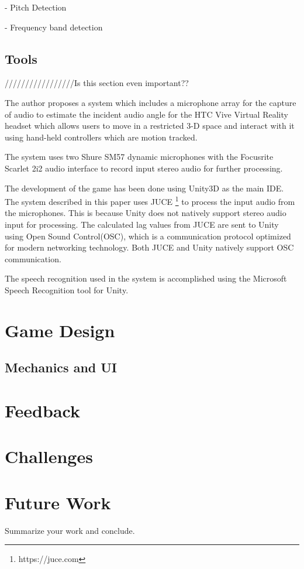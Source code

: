 \documentclass[convention]{aesconf}
\begin{document}
- Pitch Detection

- Frequency band detection 

\subsection{Tools} 
/////////////////Is this section even important??

The author proposes a system which includes a microphone array for the capture of audio to estimate the incident audio angle for the HTC Vive Virtual Reality headset which allows users to move in a restricted 3-D space and interact with it using hand-held controllers which are motion tracked. 

The system uses two Shure SM57 dynamic microphones with the Focusrite Scarlet 2i2 audio interface to record input stereo audio for further processing.

The development of the game has been done using Unity3D as the main IDE. The system described in this paper uses JUCE \footnote{https://juce.com} to process the input audio from the microphones. This is because Unity does not natively support stereo audio input for processing. The calculated lag values from JUCE are sent to Unity using Open Sound Control(OSC), which is a communication protocol optimized for modern networking technology. Both JUCE and Unity natively support OSC communication.

The speech recognition used in the system is accomplished using the Microsoft Speech Recognition tool for Unity. 

\section{Game Design} 

\subsection{Mechanics and UI} 

\section{Feedback} 

\section{Challenges} 

\section{Future Work} 

Summarize your work and conclude.




\end{document}
